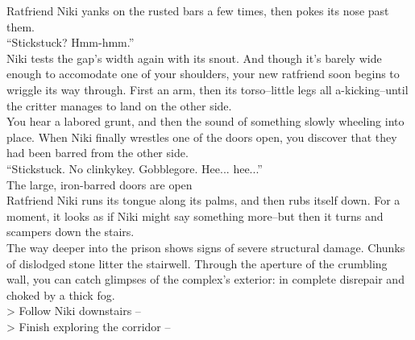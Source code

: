 Ratfriend Niki yanks on the rusted bars a few times, then pokes its nose past them.\\

“Stickstuck? Hmm-hmm.”\\

Niki tests the gap’s width again with its snout. And though it’s barely wide enough to accomodate one of your shoulders, your new ratfriend soon begins to wriggle its way through. First an arm, then its torso--little legs all a-kicking--until the critter manages to land on the other side.\\

You hear a labored grunt, and then the sound of something slowly wheeling into place. When Niki finally wrestles one of the doors open, you discover that they had been barred from the other side.\\

“Stickstuck. No clinkykey. Gobblegore. Hee... hee...”\\
 The large, iron-barred doors are open\\

Ratfriend Niki runs its tongue along its palms, and then rubs itself down. For a moment, it looks as if Niki might say something more--but then it turns and scampers down the stairs.\\

The way deeper into the prison shows signs of severe structural damage. Chunks of dislodged stone litter the stairwell. Through the aperture of the crumbling wall, you can catch glimpses of the complex’s exterior: in complete disrepair and choked by a thick fog.\\

> Follow Niki downstairs -- \\
> Finish exploring the corridor -- 